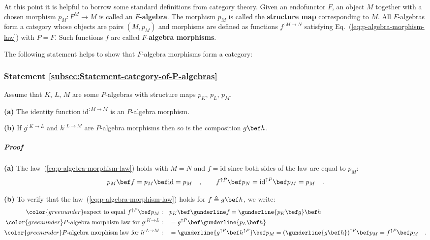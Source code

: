 At this point it is helpful to borrow some standard definitions from
category theory. Given an endofunctor $F$,
an object $M$ together with a chosen morphism $p_{M}:F^{M}\rightarrow M$
is called an $F$\textbf{-algebra}. The morphism $p_{M}$ is called
the \textbf{structure map} corresponding
to $M$.  All $F$-algebras form a category whose
objects are pairs $\left(M,p_{M}\right)$ and morphisms are defined
as functions $f^{:M\rightarrow N}$ satisfying Eq.~(\ref{eq:p-algebra-morphism-law})
with $P=F$. Such functions $f$ are called $F$-\textbf{algebra morphisms}.

The following statement helps to show that $F$-algebra morphisms
form a category:

\subsubsection{Statement \label{subsec:Statement-category-of-P-algebras}\ref{subsec:Statement-category-of-P-algebras}}

Assume that $K$, $L$, $M$ are some $P$-algebras with structure
maps $p_{K}$, $p_{L}$, $p_{M}$.

\textbf{(a)} The identity function $\text{id}^{:M\rightarrow M}$
is an $P$-algebra morphism.

\textbf{(b)} If $g^{:K\rightarrow L}$ and $h^{:L\rightarrow M}$
are $P$-algebra morphisms then so is the composition $g\bef h$.

\subparagraph{Proof}

\textbf{(a)} The law~(\ref{eq:p-algebra-morphism-law}) holds with
$M=N$ and $f=\text{id}$ since both sides of the law are equal to
$p_{M}$:
\[
p_{M}\bef f=p_{M}\bef\text{id}=p_{M}\quad,\quad\quad f^{\uparrow P}\bef p_{N}=\text{id}^{\uparrow P}\bef p_{M}=p_{M}\quad.
\]

\textbf{(b)} To verify that the law~(\ref{eq:p-algebra-morphism-law})
holds for $f\triangleq g\bef h$, we write:
\begin{align*}
{\color{greenunder}\text{expect to equal }f^{\uparrow P}\bef p_{M}:}\quad & p_{K}\bef\gunderline f=\gunderline{p_{K}\bef g}\bef h\\
{\color{greenunder}P\text{-algebra morphism law for }g^{:K\rightarrow L}:}\quad & =g^{\uparrow P}\bef\gunderline{p_{L}\bef h}\\
{\color{greenunder}P\text{-algebra morphism law for }h^{:L\rightarrow M}:}\quad & =\gunderline{g^{\uparrow P}\bef h^{\uparrow P}}\bef p_{M}=(\gunderline{g\bef h})^{\uparrow P}\bef p_{M}=f^{\uparrow P}\bef p_{M}\quad.
\end{align*}

